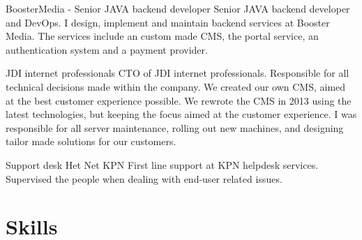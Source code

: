 \documentclass[11pt,a4paper]{moderncv}
\begin{document}
\vspace*{0.2\baselineskip}
{BoosterMedia - Senior JAVA backend developer }
{}
{}
{}
{
Senior JAVA backend developer and DevOps.
I design, implement and maintain backend services at Booster Media.
The services include an custom made CMS, the portal service,
an authentication system and a payment provider.
}

\vspace*{0.2\baselineskip}
{JDI internet professionals}
{}
{}
{}
{
CTO of JDI internet professionals. Responsible for all technical decisions
made within the company.
We created our own CMS, aimed at the best customer experience possible. We
rewrote the CMS in 2013 using the latest technologies, but keeping the focus
aimed at the customer experience.
I was responsible for all server maintenance, rolling out new machines,
and designing tailor made solutions for our customers.
}

\vspace*{0.2\baselineskip}
{Support desk Het Net}
{KPN}
{}
{}
{
First line support at KPN helpdesk services. Supervised the people when dealing
with end-user related issues.
}

\section{Skills}



\end{document}

